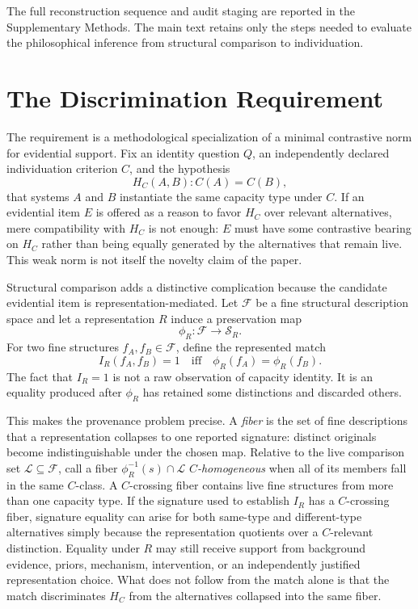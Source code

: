 \documentclass[11pt]{article}
\begin{document}
The full reconstruction sequence and audit staging are reported in the Supplementary Methods. The main text retains only the steps needed to evaluate the philosophical inference from structural comparison to individuation.



\section{The Discrimination Requirement}

The requirement is a methodological specialization of a minimal contrastive norm for evidential support. Fix an identity question \(Q\), an independently declared individuation criterion \(C\), and the hypothesis
\[
H_C(A,B): C(A)=C(B),
\]
that systems \(A\) and \(B\) instantiate the same capacity type under \(C\). If an evidential item \(E\) is offered as a reason to favor \(H_C\) over relevant alternatives, mere compatibility with \(H_C\) is not enough: \(E\) must have some contrastive bearing on \(H_C\) rather than being equally generated by the alternatives that remain live. This weak norm is not itself the novelty claim of the paper.

Structural comparison adds a distinctive complication because the candidate evidential item is representation-mediated. Let \(\mathcal F\) be a fine structural description space and let a representation \(R\) induce a preservation map
\[
\phi_R:\mathcal F\rightarrow\mathcal S_R.
\]
For two fine structures \(f_A,f_B\in\mathcal F\), define the represented match
\[
I_R(f_A,f_B)=1
\quad\text{iff}\quad
\phi_R(f_A)=\phi_R(f_B).
\]
The fact that \(I_R=1\) is not a raw observation of capacity identity. It is an equality produced after \(\phi_R\) has retained some distinctions and discarded others.

This makes the provenance problem precise. A \emph{fiber} is the set of fine descriptions that a representation collapses to one reported signature: distinct originals become indistinguishable under the chosen map. Relative to the live comparison set \(\mathcal L\subseteq\mathcal F\), call a fiber \(\phi_R^{-1}(s)\cap\mathcal L\) \emph{\(C\)-homogeneous} when all of its members fall in the same \(C\)-class. A \(C\)-crossing fiber contains live fine structures from more than one capacity type. If the signature used to establish \(I_R\) has a \(C\)-crossing fiber, signature equality can arise for both same-type and different-type alternatives simply because the representation quotients over a \(C\)-relevant distinction. Equality under \(R\) may still receive support from background evidence, priors, mechanism, intervention, or an independently justified representation choice. What does not follow from the match alone is that the match discriminates \(H_C\) from the alternatives collapsed into the same fiber.
\end{document}
